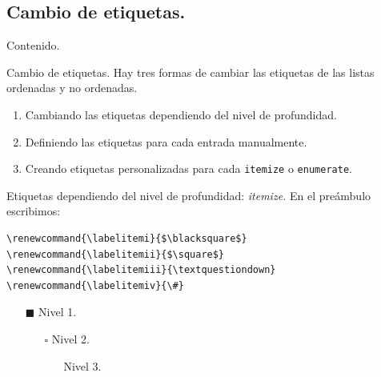 \documentclass[dvipsnames,xcolor, handout]{beamer}
\theoremstyle{plain}
\theoremstyle{definition}
\begin{document}
\subsection{Cambio de etiquetas.}
\begin{frame}{Contenido.}
  \tableofcontents[currentsubsection]
\end{frame}
\begin{frame}[fragile]{Cambio de etiquetas.}
Hay tres formas de cambiar las etiquetas de las listas ordenadas y no ordenadas. 
\begin{enumerate}
    \item Cambiando las etiquetas dependiendo del nivel de profundidad.
    \item Definiendo las etiquetas para cada entrada manualmente.
    \item Creando etiquetas personalizadas para cada \verb!itemize! o \verb!enumerate!. 
\end{enumerate}
\end{frame}

\begin{frame}[fragile]{Etiquetas dependiendo del nivel de profundidad: \itshape itemize.}
En el preámbulo escribimos:
\begin{verbatim}
\renewcommand{\labelitemi}{$\blacksquare$}
\renewcommand{\labelitemii}{$\square$}
\renewcommand{\labelitemiii}{\textquestiondown}    
\renewcommand{\labelitemiv}{\#}    
\end{verbatim}

\begin{itemize}
    \item[$\blacksquare$] Nivel 1.
    \begin{itemize}
        \item[$\square$] Nivel 2.
        \begin{itemize}
            \item[\textquestiondown] Nivel 3.
        \end{itemize}
    \end{itemize}
\end{itemize}   
\end{frame}
\end{document}
